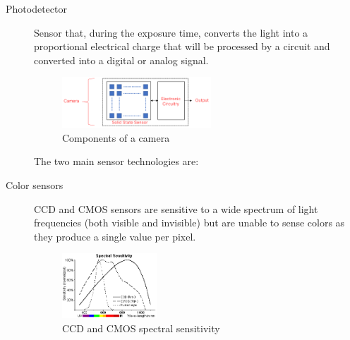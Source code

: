 \begin{description}
    \item[Photodetector] 
        Sensor that, during the exposure time, converts the light into a proportional electrical charge that 
        will be processed by a circuit and converted into a digital or analog signal.

        \begin{figure}[H]
            \centering
            \includegraphics[width=0.55\textwidth]{./img/_camera_sensors.pdf}
            \caption{Components of a camera}
        \end{figure}

        The two main sensor technologies are:

    \item[Color sensors] 
        CCD and CMOS sensors are sensitive to a wide spectrum of light frequencies (both visible and invisible) but
        are unable to sense colors as they produce a single value per pixel.

        \begin{figure}[H]
            \centering
            \includegraphics[width=0.35\textwidth]{./img/sensors_sensitivity.png}
            \caption{CCD and CMOS spectral sensitivity}
        \end{figure}


\end{description}
